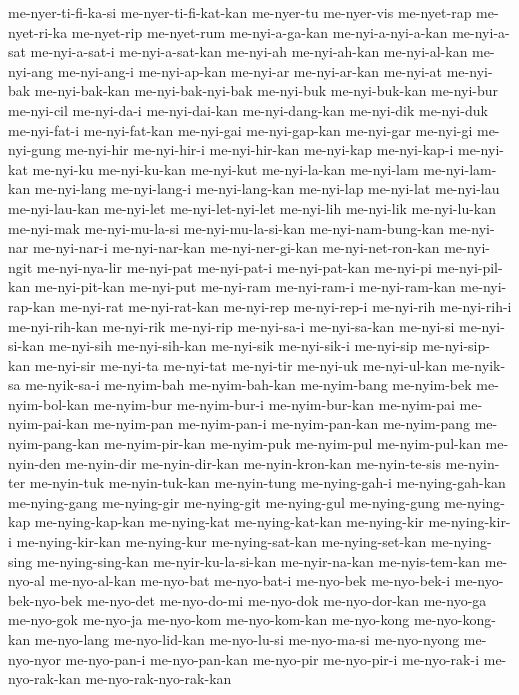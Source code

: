 {me-nyer-ti-fi-ka-si me-nyer-ti-fi-kat-kan me-nyer-tu me-nyer-vis
me-nyet-rap me-nyet-ri-ka me-nyet-rip me-nyet-rum me-nyi-a-ga-kan
me-nyi-a-nyi-a-kan me-nyi-a-sat me-nyi-a-sat-i me-nyi-a-sat-kan me-nyi-ah
me-nyi-ah-kan me-nyi-al-kan me-nyi-ang me-nyi-ang-i me-nyi-ap-kan
me-nyi-ar me-nyi-ar-kan me-nyi-at me-nyi-bak me-nyi-bak-kan
me-nyi-bak-nyi-bak me-nyi-buk me-nyi-buk-kan me-nyi-bur me-nyi-cil
me-nyi-da-i me-nyi-dai-kan me-nyi-dang-kan me-nyi-dik me-nyi-duk
me-nyi-fat-i me-nyi-fat-kan me-nyi-gai me-nyi-gap-kan me-nyi-gar me-nyi-gi
me-nyi-gung me-nyi-hir me-nyi-hir-i me-nyi-hir-kan me-nyi-kap me-nyi-kap-i
me-nyi-kat me-nyi-ku me-nyi-ku-kan me-nyi-kut me-nyi-la-kan me-nyi-lam
me-nyi-lam-kan me-nyi-lang me-nyi-lang-i me-nyi-lang-kan me-nyi-lap
me-nyi-lat me-nyi-lau me-nyi-lau-kan me-nyi-let me-nyi-let-nyi-let
me-nyi-lih me-nyi-lik me-nyi-lu-kan me-nyi-mak me-nyi-mu-la-si
me-nyi-mu-la-si-kan me-nyi-nam-bung-kan me-nyi-nar me-nyi-nar-i
me-nyi-nar-kan me-nyi-ner-gi-kan me-nyi-net-ron-kan me-nyi-ngit
me-nyi-nya-lir me-nyi-pat me-nyi-pat-i me-nyi-pat-kan me-nyi-pi
me-nyi-pil-kan me-nyi-pit-kan me-nyi-put me-nyi-ram me-nyi-ram-i
me-nyi-ram-kan me-nyi-rap-kan me-nyi-rat me-nyi-rat-kan me-nyi-rep
me-nyi-rep-i me-nyi-rih me-nyi-rih-i me-nyi-rih-kan me-nyi-rik me-nyi-rip
me-nyi-sa-i me-nyi-sa-kan me-nyi-si me-nyi-si-kan me-nyi-sih
me-nyi-sih-kan me-nyi-sik me-nyi-sik-i me-nyi-sip me-nyi-sip-kan
me-nyi-sir me-nyi-ta me-nyi-tat me-nyi-tir me-nyi-uk me-nyi-ul-kan
me-nyik-sa me-nyik-sa-i me-nyim-bah me-nyim-bah-kan me-nyim-bang
me-nyim-bek me-nyim-bol-kan me-nyim-bur me-nyim-bur-i me-nyim-bur-kan
me-nyim-pai me-nyim-pai-kan me-nyim-pan me-nyim-pan-i me-nyim-pan-kan
me-nyim-pang me-nyim-pang-kan me-nyim-pir-kan me-nyim-puk me-nyim-pul
me-nyim-pul-kan me-nyin-den me-nyin-dir me-nyin-dir-kan me-nyin-kron-kan
me-nyin-te-sis me-nyin-ter me-nyin-tuk me-nyin-tuk-kan me-nyin-tung
me-nying-gah-i me-nying-gah-kan me-nying-gang me-nying-gir me-nying-git
me-nying-gul me-nying-gung me-nying-kap me-nying-kap-kan me-nying-kat
me-nying-kat-kan me-nying-kir me-nying-kir-i me-nying-kir-kan me-nying-kur
me-nying-sat-kan me-nying-set-kan me-nying-sing me-nying-sing-kan
me-nyir-ku-la-si-kan me-nyir-na-kan me-nyis-tem-kan me-nyo-al
me-nyo-al-kan me-nyo-bat me-nyo-bat-i me-nyo-bek me-nyo-bek-i
me-nyo-bek-nyo-bek me-nyo-det me-nyo-do-mi me-nyo-dok me-nyo-dor-kan
me-nyo-ga me-nyo-gok me-nyo-ja me-nyo-kom me-nyo-kom-kan me-nyo-kong
me-nyo-kong-kan me-nyo-lang me-nyo-lid-kan me-nyo-lu-si me-nyo-ma-si
me-nyo-nyong me-nyo-nyor me-nyo-pan-i me-nyo-pan-kan me-nyo-pir
me-nyo-pir-i me-nyo-rak-i me-nyo-rak-kan me-nyo-rak-nyo-rak-kan
}
